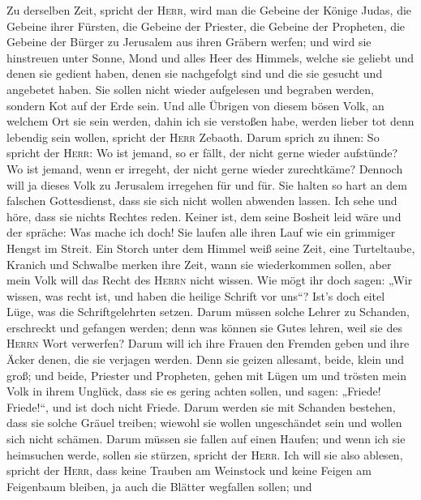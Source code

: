  Zu derselben Zeit, spricht der \textsc{Herr}, wird man
die Gebeine der Könige Judas, die Gebeine ihrer Fürsten, die Gebeine der
Priester, die Gebeine der Propheten, die Gebeine der Bürger zu Jerusalem
aus ihren Gräbern werfen;  und wird sie hinstreuen unter
Sonne, Mond und alles Heer des Himmels, welche sie geliebt und denen sie
gedient haben, denen sie nachgefolgt sind und die sie gesucht und
angebetet haben. Sie sollen nicht wieder aufgelesen und begraben werden,
sondern Kot auf der Erde sein.  Und alle Übrigen von
diesem bösen Volk, an welchem Ort sie sein werden, dahin ich sie
verstoßen habe, werden lieber tot denn lebendig sein wollen, spricht der
\textsc{Herr} Zebaoth.  Darum sprich zu ihnen: So spricht
der \textsc{Herr}: Wo ist jemand, so er fällt, der nicht gerne wieder
aufstünde? Wo ist jemand, wenn er irregeht, der nicht gerne wieder
zurechtkäme?  Dennoch will ja dieses Volk zu Jerusalem
irregehen für und für. Sie halten so hart an dem falschen Gottesdienst,
dass sie sich nicht wollen abwenden lassen.  Ich sehe und
höre, dass sie nichts Rechtes reden. Keiner ist, dem seine Bosheit leid
wäre und der spräche: Was mache ich doch! Sie laufen alle ihren Lauf wie
ein grimmiger Hengst im Streit.  Ein Storch unter dem
Himmel weiß seine Zeit, eine Turteltaube, Kranich und Schwalbe merken
ihre Zeit, wann sie wiederkommen sollen, aber mein Volk will das Recht
des \textsc{Herrn} nicht wissen.  Wie mögt ihr doch sagen:
„Wir wissen, was recht ist, und haben die heilige Schrift vor uns``?
Ist's doch eitel Lüge, was die Schriftgelehrten setzen. 
Darum müssen solche Lehrer zu Schanden, erschreckt und gefangen werden;
denn was können sie Gutes lehren, weil sie des \textsc{Herrn} Wort
verwerfen?  Darum will ich ihre Frauen den Fremden geben
und ihre Äcker denen, die sie verjagen werden. Denn sie geizen allesamt,
beide, klein und groß; und beide, Priester und Propheten, gehen mit
Lügen um  und trösten mein Volk in ihrem Unglück, dass
sie es gering achten sollen, und sagen: „Friede! Friede!{}``, und ist
doch nicht Friede.  Darum werden sie mit Schanden
bestehen, dass sie solche Gräuel treiben; wiewohl sie wollen
ungeschändet sein und wollen sich nicht schämen. Darum müssen sie fallen
auf einen Haufen; und wenn ich sie heimsuchen werde, sollen sie stürzen,
spricht der \textsc{Herr}.  Ich will sie also ablesen,
spricht der \textsc{Herr}, dass keine Trauben am Weinstock und keine
Feigen am Feigenbaum bleiben, ja auch die Blätter wegfallen sollen; und
